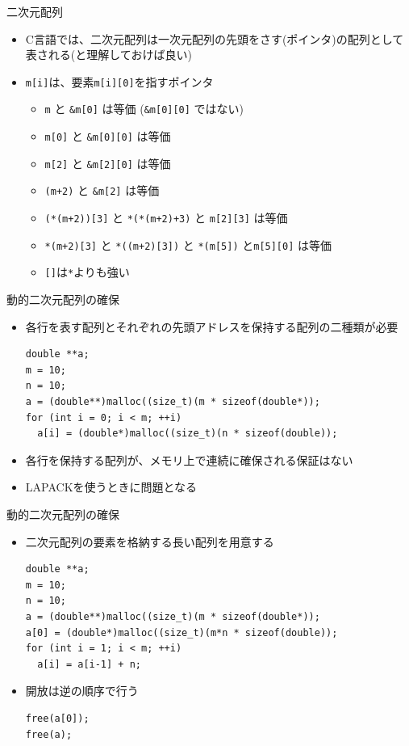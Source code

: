 \documentclass[dvipdfmx]{beamer}
\begin{document}
\begin{frame}[t,fragile]{二次元配列}
  \begin{itemize}
    \setlength{\itemsep}{1em}
  \item C言語では、二次元配列は一次元配列の先頭をさす(ポインタ)の配列として表される(と理解しておけば良い)
  \item \verb+m[i]+は、要素\verb+m[i][0]+を指すポインタ
    \begin{itemize}
    \item \verb+m+ と \verb+&m[0]+ は等価 (\verb+&m[0][0]+ ではない)
    \item \verb+m[0]+ と \verb+&m[0][0]+ は等価
    \item \verb+m[2]+ と \verb+&m[2][0]+ は等価
    \item \verb^(m+2)^ と \verb^&m[2]^ は等価
    \item \verb^(*(m+2))[3]^ と \verb^*(*(m+2)+3)^ と \verb^m[2][3]^ は等価
    \item \verb^*(m+2)[3]^ と \verb^*((m+2)[3])^ と \verb^*(m[5])^ と\verb^m[5][0]^ は等価
    \item \verb^[]^は\verb^*^よりも強い
    \end{itemize}
  \end{itemize}
\end{frame}

\begin{frame}[t,fragile]{動的二次元配列の確保}
  \begin{itemize}
    \setlength{\itemsep}{1em}
  \item 各行を表す配列とそれぞれの先頭アドレスを保持する配列の二種類が必要
\begin{lstlisting}
double **a;
m = 10;  
n = 10;  
a = (double**)malloc((size_t)(m * sizeof(double*));
for (int i = 0; i < m; ++i)
  a[i] = (double*)malloc((size_t)(n * sizeof(double));
\end{lstlisting}
\item 各行を保持する配列が、メモリ上で連続に確保される保証はない
\item LAPACKを使うときに問題となる
  \end{itemize}
\end{frame}

\begin{frame}[t,fragile]{動的二次元配列の確保}
  \begin{itemize}
    \setlength{\itemsep}{1em}
  \item 二次元配列の要素を格納する長い配列を用意する
\begin{lstlisting}
double **a;
m = 10;  
n = 10;  
a = (double**)malloc((size_t)(m * sizeof(double*));
a[0] = (double*)malloc((size_t)(m*n * sizeof(double));
for (int i = 1; i < m; ++i)
  a[i] = a[i-1] + n;
\end{lstlisting}
  \item 開放は逆の順序で行う
\begin{lstlisting}
free(a[0]);
free(a);
\end{lstlisting}
  \end{itemize}
\end{frame}
\end{document}
